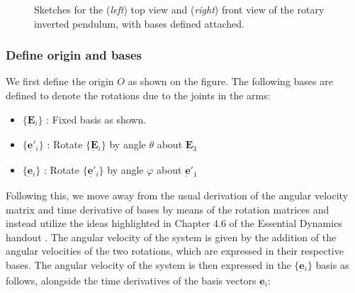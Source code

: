 \documentclass[12pt]{article}
\newcommand{\vb}[1]{{\underset{\tilde{}}{\mathbf{#1}}}}
\newcommand{\bas}[1]{\{ \vb{#1}{}_i \}}
\begin{document}
\begin{figure} [H]
\caption{Sketches for the (\textit{left}) top view and (\textit{right}) front view of the rotary inverted pendulum, with bases defined attached.}
\end{figure}

\subsubsection{Define origin and bases}
\label{sec:bases}
We first define the origin $O$ as shown on the figure. The following bases are defined to denote the rotations due to the joints in the arms:
\begin{itemize}
    \item $\bas{E}$ : Fixed basis as shown.
    \item $\bas{e'}$ : Rotate $\bas{E}$ by angle $\theta$ about $\vb{E}{}_3$
    \item $\bas{e}$ : Rotate $\bas{e'}$ by angle $\varphi$ about $\vb{e}'{}_1$
\end{itemize}

Following this, we move away from the usual derivation of the angular velocity matrix and time derivative of bases by means of the rotation matrices and instead utilize the ideas highlighted in Chapter 4.6 of the Essential Dynamics handout \cite{Parker2026Essential}. The angular velocity of the system is given by the addition of the angular velocities of the two rotations, which are expressed in their respective bases. The angular velocity of the system is then expressed in the $\bas{e}$ basis as follows, alongside the time derivatives of the basis vectors $\vb{e}{}_i$:
\end{document}
